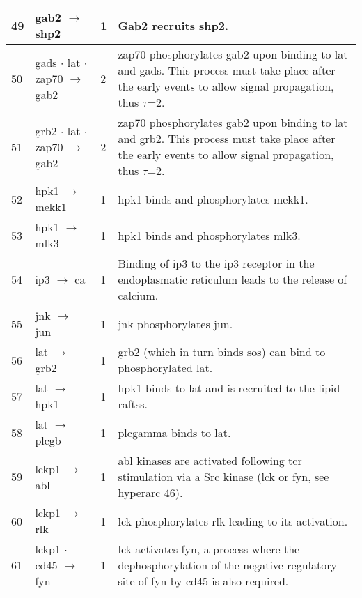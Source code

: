 \documentclass[a4paper, 12pt,epsfig, onecolumn]{article}
\newcommand{\mydot}{\hspace{-0mm} $\cdot$  \hspace{-0mm}}
\begin{document}
{\begin{center}
\begin{longtable}{|p{}|p{}|p{}|p{}|}
49& gab2 $\rightarrow$ shp2                                &1& Gab2 recruits shp2\cite{arnaud:2004}. \\ \hline
50& gads\mydot lat\mydot zap70 $\rightarrow$ gab2                   &2& zap70 phosphorylates gab2 upon binding to lat and gads\cite{yamasaki:2001,yamasaki:2003}.  This process must take place after the early events to allow signal propagation, thus $\tau$=2. \\ \hline
51& grb2\mydot lat\mydot zap70 $\rightarrow$ gab2                  &2& zap70 phosphorylates gab2 upon binding to lat and grb2\cite{yamasaki:2001,yamasaki:2003}. This process must take place after the early events to allow signal propagation, thus $\tau$=2. \\ \hline
52& hpk1 $\rightarrow$ mekk1                           &1& hpk1 binds and phosphorylates mekk1\cite{HuMC_GDev_96}. \\ \hline
53& hpk1 $\rightarrow$ mlk3                            &1& hpk1 binds and phosphorylates mlk3\cite{Tibbles_EMBO_1996}. \\ \hline
54& ip3 $\rightarrow$ ca                                 &1& Binding of ip3 to the ip3 receptor in the endoplasmatic reticulum leads to the release of calcium\cite{Chan_ARB_1999}. \\ \hline
55& jnk $\rightarrow$ jun                                &1& jnk phosphorylates jun\cite{Krauss}. \\ \hline
56& lat $\rightarrow$ grb2                     &1& grb2        (which in turn binds sos) can bind to phosphorylated lat\cite{LindquistJA_ImmRev_03}\cite{HorejsiV_NatRevImm_04}. \\ \hline
57& lat $\rightarrow$ hpk1                              &1& hpk1 binds to lat and is recruited to the lipid raftss\cite{LiouJ_Immunity_00}. \\ \hline
58& lat $\rightarrow$ plcgb                                &1& plcgamma binds to lat\cite{HorejsiV_NatRevImm_04,TogniM_MolImm_04}. \\ \hline
59& lckp1 $\rightarrow$ abl            &1& abl kinases        are activated following tcr stimulation via a Src kinase (lck or fyn,        see hyperarc 46)\cite{ZipfelPA_CurrBiol_04}. \\ \hline
60& lckp1 $\rightarrow$ rlk                                &1& lck phosphorylates rlk leading to its activation\cite{ShanX_MCB_00}. \\ \hline
61& lckp1\mydot cd45 $\rightarrow$ fyn                       &1& lck activates fyn\cite{FilippD_JImm_04}, a process where the        dephosphorylation of the negative regulatory site of fyn by cd45 is also required. \\ \hline

\end{longtable}
\end{center}}
\end{document}
